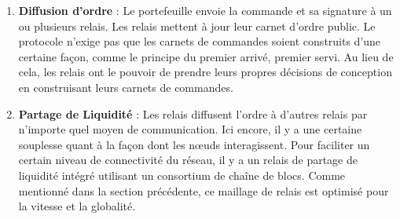 \documentclass[UTF8,nofonts]{article}
\makeatletter
\newenvironment{figurehere}
 {\def\@captype{figure}}
 {}
\makeatother
\begin{document}
\begin{multicols}{2}
\begin{enumerate}
\begin{center}
\begin{figurehere}

\caption{Processus d'échange Loopring}
\label{fig:process}
\end{figurehere}
\end{center}

\item \textbf{Diffusion d’ordre} : Le portefeuille envoie la commande et sa signature à un ou plusieurs relais. Les relais mettent à jour leur carnet d'ordre public. Le protocole n'exige pas que les carnets de commandes soient construits d'une certaine façon, comme le principe du premier arrivé, premier servi. Au lieu de cela, les relais ont le pouvoir de prendre leurs propres décisions de conception en construisant leurs carnets de commandes.

\item \textbf{Partage de Liquidité} : Les relais diffusent l'ordre à d'autres relais par n'importe quel moyen de communication. Ici encore, il y a une certaine souplesse quant à la façon dont les nœuds interagissent. Pour faciliter un certain niveau de connectivité du réseau, il y a un relais de partage de liquidité intégré utilisant un consortium de chaîne de blocs. Comme mentionné dans la section précédente, ce maillage de relais est optimisé pour la vitesse et la globalité.



\end{enumerate}
\end{multicols}
\end{document}
